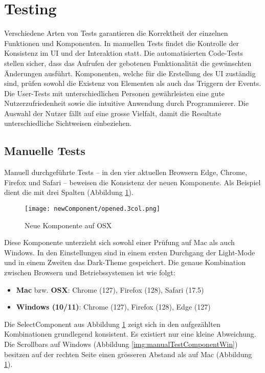 \section{Testing}
\label{sec:testing}

Verschiedene Arten von Tests garantieren die Korrektheit der einzelnen Funktionen und Komponenten. 
In manuellen Tests findet die Kontrolle der Konsistenz im UI und der Interaktion statt. 
Die automatisierten Code-Tests stellen sicher, dass das Aufrufen der gebotenen Funktionalität die gewünschten Änderungen ausführt. 
Komponenten, welche für die Erstellung des UI zuständig sind, prüfen sowohl die Existenz von Elementen als auch das Triggern der Events. 
Die User-Tests mit unterschiedlichen Personen gewährleisten eine gute Nutzerzufriedenheit sowie die intuitive Anwendung durch Programmierer. 
Die Auswahl der Nutzer fällt auf eine grosse Vielfalt, damit die Resultate unterschiedliche Sichtweisen einbeziehen. 


\subsection{Manuelle Tests}
\label{sec:manuelTests}

Manuell durchgeführte Tests – in den vier aktuellen Browsern Edge, Chrome, Firefox und Safari – beweisen die Konsistenz der neuen Komponente. 
Als Beispiel dient die  mit drei Spalten (Abbildung \ref{img:manualTestComponentOsx}). 

\begin{figure}[!htb]
    \centering
    \texttt{[image: newComponent/opened.3col.png]}
    \caption{\centering Neue Komponente auf OSX}
    \label{img:manualTestComponentOsx}
\end{figure}

Diese Komponente unterzieht sich sowohl einer Prüfung auf Mac als auch Windows. 
In den Einstellungen sind in einem ersten Durchgang der Light-Mode und in einem Zweiten das Dark-Theme gespeichert. 
Die genaue Kombination zwischen Browsern und Betriebssystemen ist wie folgt: 

\begin{itemize}
    \item \textbf{Mac} bzw. \textbf{OSX}: Chrome (127), Firefox (128), Safari (17.5)
    \item \textbf{Windows (10/11)}: Chrome (127), Firefox (128), Edge (127)
\end{itemize}

Die SelectComponent aus Abbildung \ref{img:manualTestComponentOsx} zeigt sich in den aufgezählten Kombinationen grundlegend konsistent. 
Es existiert nur eine kleine Abweichung. 
Die Scrollbars auf Windows (Abbildung \ref{img:manualTestComponentWin}) besitzen auf der rechten Seite einen grösseren Abstand als auf Mac (Abbildung \ref{img:manualTestComponentOsx}). 

